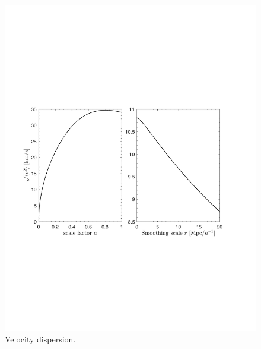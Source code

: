 \documentclass[10pt,twocolumn,preprint]{emulateapj}
\begin{document}
\begin{figure}[t]
\centering
  \includegraphics[width=1.0\linewidth]{vdisp.pdf}
 \caption{Velocity dispersion.}
\label{fig.tile}
\end{figure}
\end{document}
